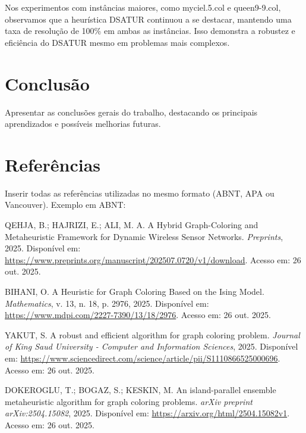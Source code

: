 \documentclass[12pt,a4paper]{article}
\begin{document}
Nos experimentos com instâncias maiores, como myciel.5.col e queen9-9.col, observamos que a heurística DSATUR continuou a se destacar, mantendo uma taxa de resolução de 100\% em ambas as instâncias. Isso demonstra a robustez e eficiência do DSATUR mesmo em problemas mais complexos.


\section{Conclusão}
Apresentar as conclusões gerais do trabalho, destacando os principais aprendizados e possíveis melhorias futuras.

\section*{Referências}

Inserir todas as referências utilizadas no mesmo formato (ABNT, APA ou Vancouver).  
Exemplo em ABNT:

\begin{thebibliography}{99}

QEHJA, B.; HAJRIZI, E.; ALI, M. A. A Hybrid Graph-Coloring and Metaheuristic Framework for Dynamic Wireless Sensor Networks. \textit{Preprints}, 2025. Disponível em: \url{https://www.preprints.org/manuscript/202507.0720/v1/download}. Acesso em: 26 out. 2025.

BIHANI, O. A Heuristic for Graph Coloring Based on the Ising Model. \textit{Mathematics}, v. 13, n. 18, p. 2976, 2025. Disponível em: \url{https://www.mdpi.com/2227-7390/13/18/2976}. Acesso em: 26 out. 2025.

YAKUT, S. A robust and efficient algorithm for graph coloring problem. \textit{Journal of King Saud University - Computer and Information Sciences}, 2025. Disponível em: \url{https://www.sciencedirect.com/science/article/pii/S1110866525000696}. Acesso em: 26 out. 2025.

DOKEROGLU, T.; BOGAZ, S.; KESKIN, M. An island-parallel ensemble metaheuristic algorithm for graph coloring problems. \textit{arXiv preprint arXiv:2504.15082}, 2025. Disponível em: \url{https://arxiv.org/html/2504.15082v1}. Acesso em: 26 out. 2025.


\end{thebibliography}
\end{document}
